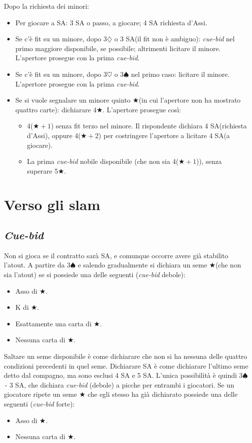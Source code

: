 \documentclass[a4paper,10pt]{article}
\renewcommand{\d}{$\diamondsuit$\xspace}
\newcommand{\h}{$\heartsuit$\xspace}
\newcommand{\s}{$\spadesuit$\xspace}
\renewcommand{\j}{$\bigstar$\xspace}
\newcommand{\sa}{SA\xspace}
\begin{document}
Dopo la richiesta dei minori:
\begin{itemize}
 \item Per giocare a \sa: 3 \sa o passo, a giocare; 4 \sa richiesta d'Assi.
 \item Se c'è fit su un minore, dopo 3\d o 3 \sa (il fit non è ambiguo): \textit{cue-bid} nel primo maggiore disponibile, se possibile; altrimenti licitare il minore.
 L'apertore prosegue con la prima \textit{cue-bid}.
 \item Se c'è fit su un minore, dopo 3\h o 3\s nel primo caso: licitare il minore.
 L'apertore prosegue con la prima \textit{cue-bid}.
 \item Se si vuole segnalare un minore quinto \j (in cui l'apertore non ha mostrato quattro carte): dichiarare 4\j.
 L'apertore prosegue così:
 \begin{itemize}
  \item 4($\bigstar+1$) senza fit terzo nel minore. Il rispondente dichiara 4 \sa (richiesta d'Assi), oppure 4($\bigstar+2$) per costringere l'apertore a licitare 4 \sa (a giocare).
  \item La prima \textit{cue-bid} nobile disponibile (che non sia 4($\bigstar+1$)), senza superare 5\j.
  
 \end{itemize}
\end{itemize}



\section{Verso gli slam}

\subsection{\it{Cue-bid}}

Non si gioca se il contratto sar\`a SA, e comunque occorre avere gi\`a stabilito l'atout. A partire da 3\s e salendo gradualmente si dichiara un seme \j (che non sia l'atout) se si possiede una delle seguenti (\textit{cue-bid} debole):
\begin{itemize}
\item Asso di \j.
\item K di \j.
\item Esattamente una carta di \j.
\item Nessuna carta di \j.
\end{itemize}

Saltare un seme disponibile \`e come dichiarare che non si ha nessuna delle quattro condizioni precedenti in quel seme. Dichiarare SA \`e come dichiarare l'ultimo seme detto dal compagno, ma sono esclusi 4 SA e 5 SA. L'unica possibilit\`a \`e quindi 3\s\,- 3 SA, che dichiara \textit{cue-bid} (debole) a picche per entrambi i giocatori. Se un giocatore ripete un seme \j che egli stesso ha gi\`a dichiarato possiede una delle seguenti (\textit{cue-bid} forte):
\begin{itemize}
\item Asso di \j.
\item Nessuna carta di \j.
\end{itemize}
\end{document}
